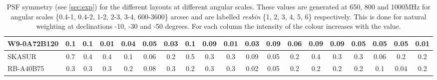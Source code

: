 \begin{table}[!htp]
{{\begin{tabular}{|lcccccc||cccccc||cccccc|}
W9-0A72B120 & 0.1 \cellcolor{blue!20.29} & 0.1 \cellcolor{red!18.00} & 0.01 \cellcolor{green!18.00} & 0.04 \cellcolor{orange!18.00} & 0.05 \cellcolor{purple!39.00} & 0.03 \cellcolor{blue!21.36} & 0.1 \cellcolor{blue!18.00} & 0.09 \cellcolor{red!18.00} & 0.01 \cellcolor{green!19.20} & 0.03 \cellcolor{orange!24.00} & 0.09 \cellcolor{purple!60.00} & 0.06 \cellcolor{blue!25.41} & 0.09 \cellcolor{blue!22.67} & 0.09 \cellcolor{red!23.25} & 0.05 \cellcolor{green!18.00} & 0.05 \cellcolor{orange!30.00} & 0.05 \cellcolor{purple!26.40} & 0.01 \cellcolor{blue!18.00}\\ \hline 
SKASUR & 0.7 \cellcolor{blue!60.00} & 0.4 \cellcolor{red!60.00} & 0.4 \cellcolor{green!60.00} & 0.1 \cellcolor{orange!50.31} & 0.06 \cellcolor{purple!46.00} & 0.2 \cellcolor{blue!54.96} & 0.5 \cellcolor{blue!60.00} & 0.3 \cellcolor{red!60.00} & 0.3 \cellcolor{green!60.00} & 0.09 \cellcolor{orange!60.00} & 0.05 \cellcolor{purple!18.00} & 0.2 \cellcolor{blue!57.53} & 0.4 \cellcolor{blue!60.00} & 0.3 \cellcolor{red!60.00} & 0.3 \cellcolor{green!60.00} & 0.06 \cellcolor{orange!36.00} & 0.2 \cellcolor{purple!60.00} & 0.2 \cellcolor{blue!50.00}\\ \hline 
RB-A40B75 & 0.3 \cellcolor{blue!32.51} & 0.3 \cellcolor{red!41.80} & 0.3 \cellcolor{green!42.42} & 0.2 \cellcolor{orange!60.00} & 0.08 \cellcolor{purple!60.00} & 0.3 \cellcolor{blue!60.00} & 0.2 \cellcolor{blue!32.34} & 0.3 \cellcolor{red!46.56} & 0.3 \cellcolor{green!49.20} & 0.02 \cellcolor{orange!18.00} & 0.05 \cellcolor{purple!18.00} & 0.2 \cellcolor{blue!60.00} & 0.2 \cellcolor{blue!41.33} & 0.2 \cellcolor{red!51.25} & 0.2 \cellcolor{green!47.08} & 0.1 \cellcolor{orange!60.00} & 0.04 \cellcolor{purple!23.60} & 0.2 \cellcolor{blue!60.00}\tabularnewline \hline 
\end{tabular}}\hfill 

\caption{PSF symmetry (see \autoref{sec:exp})  for the different layouts at different angular scales. These values are generated at 650, 800 and 1000MHz for angular scales \{0.4-1, 0.4-2, 1-2, 2-3, 3-4, 600-3600\} arcsec and are labelled {\it resbin} \{1, 2, 3, 4, 5, 6\} respectively. This is done for natural weighting at declinations -10, -30 and -50 degrees. For each column the intensity of the colour increases with the value.}\label{tab:psf_sym-new}}
 \end{table}